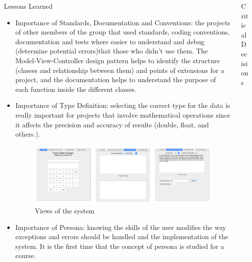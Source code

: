 \documentclass[final]{beamer}
\newlength{\onecolwid}
\begin{document}
\begin{frame}[t]
\begin{columns}[t]
\begin{column}{\onecolwid}
\begin{block}{Lessons Learned}
\begin{itemize}
\item Importance of Standards, Documentation and Conventions: the projects of other members of the group that used standards, coding conventions, documentation and tests where easier to understand and debug (determine potential errors)that those who didn't use them. The Model-View-Controller design pattern helps to identify the structure (classes and relationship between them) and points of extensions for a project, and the documentation helps to understand the purpose of each function inside the different classes.\newline

\item Importance of Type Definition: selecting the correct type for the data is really important for projects that involve mathematical operations since it affects the precision and accuracy of results (double, float, and others.).\newline

\begin{figure}
\includegraphics[width=0.8\linewidth]{images/views.png}
\caption{Views of the system}
\end{figure}

\item Importance of Persona: knowing the skills of the user modifies the way exceptions and errors should be handled and the implementation of the system. It is the first time that the concept of persona is studied for a course.\newline



\end{itemize}
\end{block}






\end{column} %

\begin{column}{\onecolwid} 

\begin{block}{Critical Decisions}
\begin{itemize}


\end{itemize}
\end{block}
\end{column}
\end{columns}
\end{frame}
\end{document}
